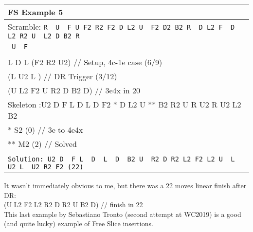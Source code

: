 \documentclass[11pt,a4paper]{book}
\newcommand{\p}{\textquotesingle}
\newcommand{\m}{\texttt}
\newcommand{\ps}{\p\,\,}
\newcommand{\comment}[1]{{\color{gray}\quad//#1}}
\begin{document}
\bigskip
\begin{tabular}{|l|}
\hline
\textbf{FS Example 5}\\
\hline
Scramble: \m{R\ps U\ps F U F2 R2 F2 D L2 U\ps F2 D2 B2 R\ps D L2 F\ps D\ps L2 R2 U\ps L2 D B2 R\ps}\\ \m{ U\ps F}\\
\hline
\begin{minipage}[l]{0.650\textwidth}
\bigskip
\m{ U2 D\ps F\comment{ EO (3/3)}\\
L\ps D\ps L\ps (F2 R2 U2) \comment{ Setup, 4c-1e case (6/9)}\\
(L U2 L\ps) \comment{ DR Trigger (3/12)}\\
(U L2 F2 U\ps R2 D B2 D) \comment{ 3e4x in 20}\\
\newline
Skeleton :U2 D\ps  F  L\ps D\ps L\ps D\ps F2 * D\ps L2 U ** B2 R2 U\ps R U2 R\ps  U2 L2 B2 \\
*  S2 (0) \comment{ 3e to 4e4x}\\
** M2 (2) \comment{ Solved}\\
}
\bigskip
\end{minipage}
\begin{minipage}[c]{0.25\textwidth}
\centering
\def\svgwidth{\columnwidth}

\end{minipage}\\
\hline
\m{Solution: U2 D\ps F L\ps D\ps L\ps D\ps B2 U\ps R2 D R2 L2 F2 L2 U\ps L U2 L\ps U2 R2 F2 (22)}\\
\hline
\end{tabular}
\bigskip
\newline
It wasn't immediately obvious to me, but there was a 22 moves linear finish after DR:\\
(U L2 F2 L2 R2 D\ps R2 U B2 D) // finish in 22\\
\newpage
This last example by Sebastiano Tronto (second attempt at WC2019) is a good (and quite lucky) example of Free Slice insertions.\\
\end{document}
